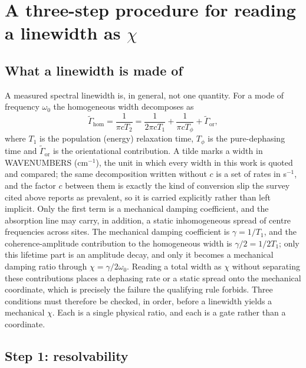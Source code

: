 \section{A three-step procedure for reading a linewidth as \texorpdfstring{$\chi$}{chi}}

\subsection{What a linewidth is made of}

A measured spectral linewidth is, in general, not one quantity. For a mode of frequency $\omega_0$ the homogeneous width decomposes as
\begin{equation}
\widetilde{\Gamma}_{\mathrm{hom}} = \frac{1}{\pi c T_2} = \frac{1}{2\pi c T_1} + \frac{1}{\pi c T_\phi} + \widetilde{\Gamma}_{\mathrm{or}},
\end{equation}
where $T_1$ is the population (energy) relaxation time, $T_\phi$ is the pure-dephasing time and $\widetilde{\Gamma}_{\mathrm{or}}$ is the orientational contribution. A tilde marks a width in WAVENUMBERS (cm$^{-1}$), the unit in which every width in this work is quoted and compared; the same decomposition written without $c$ is a set of rates in s$^{-1}$, and the factor $c$ between them is exactly the kind of conversion slip the survey cited above reports as prevalent, so it is carried explicitly rather than left implicit. Only the first term is a mechanical damping coefficient, and the absorption line may carry, in addition, a static inhomogeneous spread of centre frequencies across sites. The mechanical damping coefficient is $\gamma = 1/T_1$, and the coherence-amplitude contribution to the homogeneous width is $\gamma/2 = 1/2T_1$; only this lifetime part is an amplitude decay, and only it becomes a mechanical damping ratio through $\chi = \gamma/2\omega_0$. Reading a total width as $\chi$ without separating these contributions places a dephasing rate or a static spread onto the mechanical coordinate, which is precisely the failure the qualifying rule forbids. Three conditions must therefore be checked, in order, before a linewidth yields a mechanical $\chi$. Each is a single physical ratio, and each is a gate rather than a coordinate.

\subsection{Step 1: resolvability}

